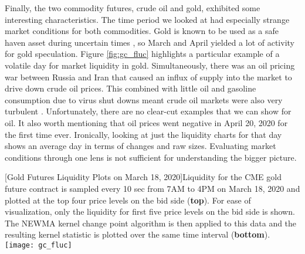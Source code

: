Finally, the two commodity futures, crude oil and gold, exhibited some interesting characteristics. The time period we looked at had especially strange market conditions for both commodities. Gold is known to be used as a safe haven asset during uncertain times \cite{cheema20202008}, so March and April yielded a lot of activity for gold speculation. Figure \ref{fig:gc_fluc} highlights a particular example of a volatile day for market liquidity in gold. Simultaneously, there was an oil pricing war between Russia and Iran that caused an influx of supply into the market to drive down crude oil prices. This combined with little oil and gasoline consumption due to virus shut downs meant crude oil markets were also very turbulent \cite{albulescu2020coronavirus}. Unfortunately, there are no clear-cut examples that we can show for oil. It also worth mentioning that oil prices went negative in April 20, 2020 for the first time ever. Ironically, looking at just the liquidity charts for that day shows an average day in terms of changes and raw sizes. Evaluating market conditions through one lens is not sufficient for understanding the bigger picture.

\begin{minipage}{0.96\textwidth}
\begin{center} 
[Gold Futures Liquidity Plots on March 18, 2020]{Liquidity for the CME gold future contract is sampled every 10 sec from 7AM to 4PM on March 18, 2020 and plotted at the top four price levels on the bid side (\textbf{top}). For ease of visualization, only the liquidity for first five price levels on the bid side is shown. The NEWMA kernel change point algorithm is then applied to this data and the resulting kernel statistic is plotted over the same time interval (\textbf{bottom}). } 
\texttt{[image: gc\_fluc]} 
\label{fig:gc_fluc} 
\end{center}
\end{minipage}
